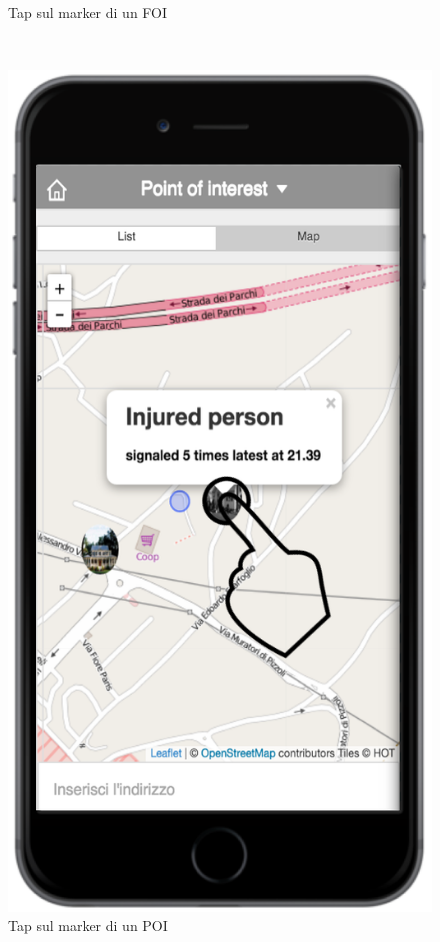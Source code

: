 \begin{figure}
\begin{minipage}[b]{6cm}
	\caption{Tap sul marker di un FOI }
	\label{fig:tapmarker}
 \end{minipage}
 \ \hspace{6 mm} \hspace{7 mm} \
 \begin{minipage}[b]{6cm}
\centering
\includegraphics[scale=0.6]{interfaccia/tappoimarker.png}
	\caption{Tap sul marker di un POI }
	\label{fig:poilist}
 \end{minipage}
\end{figure}





	